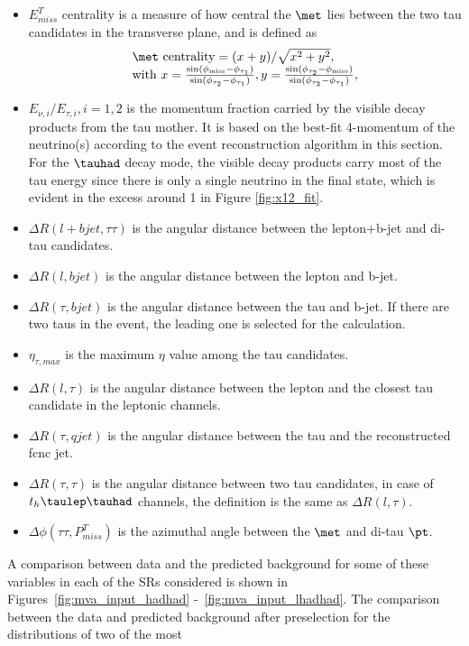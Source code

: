 \begin{itemize}
\item $E^{T}_{miss}$ centrality is a measure of how central the $\met$ lies between the two tau candidates in the transverse plane, and is defined as
\begin{eqnarray}
\begin{array}{l}
\met~\text{centrality} = {(x+y)}/{\sqrt{x^2+y^2}}, \\
\text{with}~x=\frac{\sin(\phi_{\text{miss}}-\phi_{\tau_1})}{\sin(\phi_{\tau_2}-\phi_{\tau_1})},  y=\frac{\sin(\phi_{\tau_2}-\phi_{\text{miss}})}{\sin(\phi_{\tau_2}-\phi_{\tau_1})} ,
\end{array}
\label{eq:eq3}
\end{eqnarray}
\item $E_{\nu,i}/E_{\tau,i},i=1,2$ is the momentum fraction carried by the visible decay products from the tau mother. It is based on the best-fit 4-momentum of the neutrino(s) according to the event reconstruction algorithm in this section. For the $\tauhad$ decay mode, the visible decay products carry most of the tau energy since there is only a single neutrino in the final state, which is evident in the excess around 1 in Figure \ref{fig:x12_fit}. 
\item $\Delta R(l+bjet,\tau\tau)$ is the angular distance between the lepton+b-jet and di-tau candidates.
\item $\Delta R(l,bjet)$ is the angular distance between the lepton and b-jet.
\item $\Delta R(\tau,bjet)$ is the angular distance between the tau and b-jet. If there are two taus in the event, the leading one is selected for the calculation.
\item $\eta_{\tau,max}$ is the maximum $\eta$ value among the tau candidates.
\item $\Delta R(l,\tau)$ is the angular distance between the lepton and the closest tau candidate in the leptonic channels.
\item $\Delta R(\tau,qjet)$ is the angular distance between the tau and the reconstructed fcnc jet.
\item $\Delta R(\tau,\tau)$ is the angular distance between two tau candidates, in case of $t_h\tlhad$ channels, the definition is the same as $\Delta R(l,\tau)$.
\item $\Delta\phi(\tau\tau,P^{T}_{miss})$ is the azimuthal angle between the $\met$ and di-tau $\pt$.
\end{itemize}
A comparison between data and the predicted background for some of these variables in each of the SRs considered is shown in Figures~\ref{fig:mva_input_hadhad} -~\ref{fig:mva_input_lhadhad}. The comparison between the data and predicted background after preselection for the distributions of two of the most 
